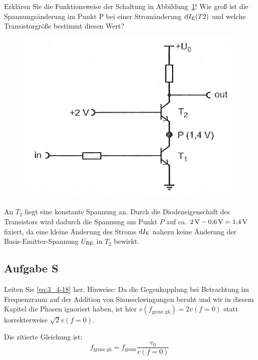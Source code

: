 \begin{problem}
    Erklären Sie die Funktionsweise der Schaltung in
    Abbildung~\ref{fig:3_4-15}! Wie groß ist die Spannungsänderung im Punkt P
    bei einer Stromänderung $\dif  \IE(T2)$ und welche
    Transistorgröße bestimmt diesen Wert?
\end{problem}

\begin{figure}[htbp]
    \centering
    \includegraphics[width=.6\textwidth]{Anleitung/3_4-15.png}
    \caption{%
        \cite[Abbildung~3/4.15]{physik313-Anleitung}
    }
    \label{fig:3_4-15}
\end{figure}

An $T_2$ liegt eine konstante Spannung an. Durch die Diodeneigenschaft des
Transistors wird dadurch die Spannung am Punkt $P$ auf ca. $\SI 2{\volt} -
\SI{0.6}{\volt} = \SI{1.4}{\volt}$ fixiert, da eine kleine Änderung des Stroms
$\dif\IE$ nahezu keine Änderung der Basis-Emitter-Spannung $U_\text{BE}$ in $T_2$
bewirkt.


\FloatBarrier
\subsection{Aufgabe S}

\begin{problem}
    Leiten Sie \eqref{eq:3_4-18} her. Hinweise: Da die Gegenkopplung bei
    Betrachtung im Frequenzraum auf der Addition von Sinusschwingungen beruht
    und wir in diesem Kapitel die Phasen ignoriert haben, ist hier
    $v(f_\text{grenz gk}) = 2v(f=0)$ statt korrekterweise $\sqrt 2 v (f = 0)$.
\end{problem}

Die zitierte Gleichung ist:
\begin{equation}
    \label{eq:3_4-18}
    f_\text{grenz gk} = f_\text{grenz} \frac{v_0}{v(f=0)}
\end{equation}

